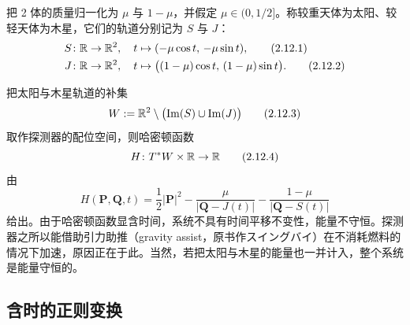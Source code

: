 把 2 体的质量归一化为 $\mu$ 与 $1-\mu$，并假定 $\mu\in(0,1/2]$。称较重天体为太阳、较轻天体为木星，它们的轨道分别记为 $S$ 与 $J$：
\begin{align}
  S&\colon\mathbb{R}\to\mathbb{R}^2,\quad t\mapsto(-\mu\cos t,\,-\mu\sin t),
  \tag{2.12.1}\\
  J&\colon\mathbb{R}\to\mathbb{R}^2,\quad t\mapsto\bigl((1-\mu)\cos t,\,(1-\mu)\sin t\bigr).
  \tag{2.12.2}
\end{align}

把太阳与木星轨道的补集
\begin{equation}
  W := \mathbb{R}^2\setminus\bigl(\operatorname{Im}(S)\cup\operatorname{Im}(J)\bigr)
  \tag{2.12.3}
\end{equation}
取作探测器的配位空间，则哈密顿函数
\begin{equation}
  H\colon T^*W\times\mathbb{R}\to\mathbb{R}
  \tag{2.12.4}
\end{equation}
由
\begin{equation}
  H(\bm{P},\bm{Q},t) = \frac12|\bm{P}|^2 - \frac{\mu}{|\bm{Q}-J(t)|} - \frac{1-\mu}{|\bm{Q}-S(t)|}
  \tag{2.12.5}
\end{equation}
给出。由于哈密顿函数显含时间，系统不具有时间平移不变性，能量不守恒。探测器之所以能借助引力助推（gravity assist，原书作スイングバイ）在不消耗燃料的情况下加速，原因正在于此。当然，若把太阳与木星的能量也一并计入，整个系统是能量守恒的。

\subsection{含时的正则变换}

